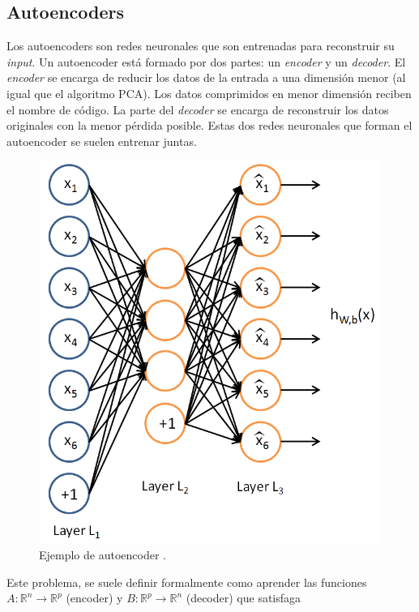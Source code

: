 \subsection{Autoencoders}

Los autoencoders son redes neuronales que son entrenadas para reconstruir su \textit{input}. Un autoencoder está formado por dos partes: un \textit{encoder} y un \textit{decoder}. El \textit{encoder} se encarga de reducir los datos de la entrada a una dimensión menor (al igual que el algoritmo PCA). Los datos comprimidos en menor dimensión reciben el nombre de código. La parte del \textit{decoder} se encarga de reconstruir los datos originales con la menor pérdida posible. Estas dos redes neuronales que forman el autoencoder se suelen entrenar juntas.

\begin{figure}[H]
	\includegraphics[scale=0.3]{imagenes/03_Estado_del_arte/autoencoder.png}
	\centering
	\caption{Ejemplo de autoencoder \cite{vae}.}
	\label{fig:autoencoder}
\end{figure}

Este problema, se suele definir formalmente como aprender las funciones $A: \mathbb{R}^n \rightarrow \mathbb{R}^p$ (encoder) y $B: \mathbb{R}^p \rightarrow \mathbb{R}^n$ (decoder) que satisfaga

